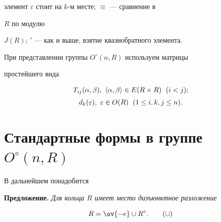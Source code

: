 элемент $\varepsilon$ стоит на $k$-м месте; $\equiv$ --- сравнение в 


$R$ по модулю 


$J(R)$; ${}'$ --- как и выше, взятие квазиобратного элемента. 


 


При представлении группы $O^\circ(n,R)$ используем матрицы 


простейшего вида 


\begin{equation} 


\begin{array}{c}


T_{ij}(\alpha,\beta),\ \la\alpha,\beta\ra\in 


E(R\times R) \ \; (i<j);\\[2mm] 


d_k(\varepsilon),\ \varepsilon\in O(R)\ \; (1\le i,k,j\le n). 


\end{array} 


\end{equation} 


 


\section{Стандартные формы в группе $O^\circ(n,R)$} 


 


В дальнейшем понадобится 


\medskip 


 


{\bf Предложение.} {\it Для кольца $R$ имеет место дизъюнктное разложение} 


\begin{equation} 


R=\ov{-e}\cup R^\circ.\tag{$\cup$} 


\end{equation} 


 


